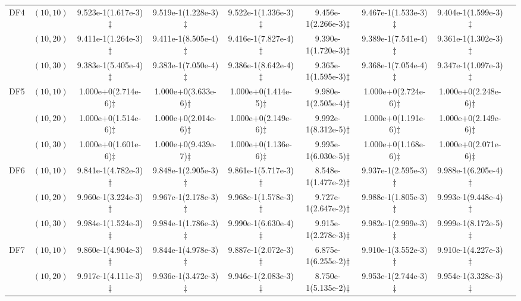 \documentclass[review]{elsarticle}
\begin{document}
\begin{table*}[!tbh]
{{\begin{tabular} {ccccccccc}
\hline  \multirow{3}{*}{DF4}
&$(10,10)$ &9.523e-1(1.617e-3)$\ddagger$ &9.519e-1(1.228e-3)$\ddagger$ &9.522e-1(1.336e-3)$\ddagger$ &9.456e-1(2.266e-3)$\ddagger$ &9.467e-1(1.533e-3)$\ddagger$ &9.404e-1(1.599e-3)$\ddagger$ \\
&$(10,20)$ &9.411e-1(1.264e-3)$\ddagger$ &9.411e-1(8.505e-4)$\ddagger$ &9.416e-1(7.827e-4)$\ddagger$ &9.390e-1(1.720e-3)$\ddagger$ &9.389e-1(7.541e-4)$\ddagger$ &9.361e-1(1.302e-3)$\ddagger$ \\
&$(10,30)$ &9.383e-1(5.405e-4)$\ddagger$ &9.383e-1(7.050e-4)$\ddagger$ &9.386e-1(8.642e-4)$\ddagger$ &9.365e-1(1.595e-3)$\ddagger$ &9.368e-1(7.054e-4)$\ddagger$ &9.347e-1(1.097e-3)$\ddagger$ \\
\hline  \multirow{3}{*}{DF5}
&$(10,10)$ &1.000e+0(2.714e-6)$\ddagger$ &1.000e+0(3.633e-6)$\ddagger$ &1.000e+0(1.414e-5)$\ddagger$ &9.980e-1(2.505e-4)$\ddagger$ &1.000e+0(2.724e-6)$\ddagger$ &1.000e+0(2.248e-6)$\ddagger$ \\
&$(10,20)$ &1.000e+0(1.514e-6)$\ddagger$ &1.000e+0(2.014e-6)$\ddagger$ &1.000e+0(2.149e-6)$\ddagger$ &9.992e-1(8.312e-5)$\ddagger$ &1.000e+0(1.191e-6)$\ddagger$ &1.000e+0(2.149e-6)$\ddagger$ \\
&$(10,30)$ &1.000e+0(1.601e-6)$\ddagger$ &1.000e+0(9.439e-7)$\ddagger$ &1.000e+0(1.136e-6)$\ddagger$ &9.995e-1(6.030e-5)$\ddagger$ &1.000e+0(1.168e-6)$\ddagger$ &1.000e+0(2.071e-6)$\ddagger$ \\
\hline  \multirow{3}{*}{DF6}
&$(10,10)$ &9.841e-1(4.782e-3)$\ddagger$ &9.848e-1(2.905e-3)$\ddagger$ &9.861e-1(5.717e-3)$\ddagger$ &8.548e-1(1.477e-2)$\ddagger$ &9.937e-1(2.595e-3)$\ddagger$ &9.988e-1(6.205e-4)$\ddagger$ \\
&$(10,20)$ &9.960e-1(3.224e-3)$\ddagger$ &9.967e-1(2.178e-3)$\ddagger$ &9.968e-1(1.578e-3)$\ddagger$ &9.727e-1(2.647e-2)$\ddagger$ &9.988e-1(1.805e-3)$\ddagger$ &9.993e-1(9.448e-4)$\ddagger$ \\
&$(10,30)$ &9.984e-1(1.524e-3)$\ddagger$ &9.984e-1(1.786e-3)$\ddagger$ &9.990e-1(6.630e-4)$\ddagger$ &9.915e-1(2.278e-3)$\ddagger$ &9.982e-1(2.999e-3)$\ddagger$ &9.999e-1(8.172e-5)$\ddagger$ \\
\hline  \multirow{3}{*}{DF7}
&$(10,10)$ &9.860e-1(4.904e-3)$\ddagger$ &9.844e-1(4.978e-3)$\ddagger$ &9.887e-1(2.072e-3)$\ddagger$ &6.875e-1(6.255e-2)$\ddagger$ &9.910e-1(3.552e-3)$\ddagger$ &9.910e-1(4.227e-3)$\ddagger$ \\
&$(10,20)$ &9.917e-1(4.111e-3)$\ddagger$ &9.936e-1(3.472e-3)$\ddagger$ &9.946e-1(2.083e-3)$\ddagger$ &8.750e-1(5.135e-2)$\ddagger$ &9.953e-1(2.744e-3)$\ddagger$ &9.954e-1(3.328e-3)$\ddagger$ \\

\end{tabular}}}
\end{table*}
\end{document}
